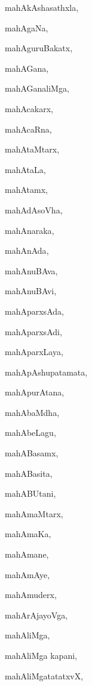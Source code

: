 \begin{multicols}{2}
{mahAkAshasathxla}, \pageref{mahAkAshasathxla}

{mahAgaNa}, \pageref{mahAgaNa}

{mahAguruBakatx}, \pageref{mahAguruBakatx}

{mahAGana}, \pageref{mahAGana}

{mahAGanaliMga}, \pageref{mahAGanaliMga}

{mahAcakarx}, \pageref{mahAcakarx}

{mahAcaRna}, \pageref{mahAcaRna}

{mahAtaMtarx}, \pageref{mahAtaMtarx}

{mahAtaLa}, \pageref{mahAtaLa}

{mahAtamx}, \pageref{mahAtamx}

{mahAdAsoVha}, \pageref{mahAdAsoVha}

{mahAnaraka}, \pageref{mahAnaraka}

{mahAnAda}, \pageref{mahAnAda}

{mahAnuBAva}, \pageref{mahAnuBAva}

{mahAnuBAvi}, \pageref{mahAnuBAvi}

{mahAparxsAda}, \pageref{mahAparxsAda}

{mahAparxsAdi}, \pageref{mahAparxsAdi}

{mahAparxLaya}, \pageref{mahAparxLaya}

{mahApAshupatamata}, \pageref{mahApAshupatamata}

{mahApurAtana}, \pageref{mahApurAtana}

{mahAbaMdha}, \pageref{mahAbaMdha}

{mahAbeLagu}, \pageref{mahAbeLagu}

{mahABasamx}, \pageref{mahABasamx}

{mahABasita}, \pageref{mahABasita}

{mahABUtani}, \pageref{mahABUtani}

{mahAmaMtarx}, \pageref{mahAmaMtarx}

{mahAmaKa}, \pageref{mahAmaKa}

{mahAmane}, \pageref{mahAmane}

{mahAmAye}, \pageref{mahAmAye}

{mahAmuderx}, \pageref{mahAmuderx}

{mahArAjayoVga}, \pageref{mahArAjayoVga}

{mahAliMga}, \pageref{mahAliMga}

{mahAliMga kapani}, \pageref{mahAliMga kapani}

{mahAliMgatatatxvX}, \pageref{mahAliMgatatatxvX}


\end{multicols}
